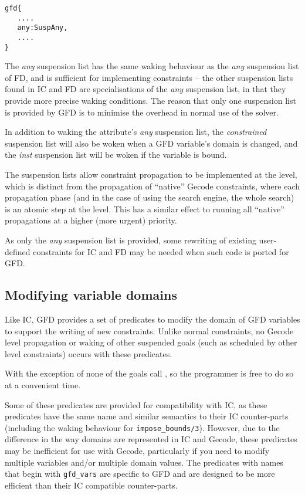 \begin{verbatim}
gfd{
   ....
   any:SuspAny,
   ....
}
\end{verbatim}

The {\it any\/} suspension list has the same waking behaviour as the 
{\it any\/} suspension
list of FD, and is sufficient for implementing constraints -- the other 
suspension lists found in IC and FD are specialisations of the {\it any\/} 
suspension list, in that they provide more precise waking conditions. 
The reason that
only one suspension list is provided by GFD is to minimise the overhead in
normal use of the solver. 


In addition to waking the attribute's {\it any\/} suspension list, the 
{\it constrained\/}
suspension list will also be woken when a GFD variable's domain is changed,
and the {\it inst\/} suspension list will be woken if the variable is bound.

The suspension lists allow constraint propagation to be implemented at the
{\eclipse} level, which is distinct from the propagation of ``native'' Gecode
constraints, where each propagation phase (and in the case of using the 
search engine, the whole search) is an atomic step at the {\eclipse} level. 
This has a similar effect to running all ``native'' propagations
at a higher (more urgent) priority.
 
As only the {\it any\/} suspension list is provided, some rewriting of existing
user-defined constraints for IC and FD may be needed when such code is ported
for GFD.

\subsection{Modifying variable domains}

Like IC, GFD provides a set of predicates to modify the domain of GFD 
variables to support the writing of new constraints. Unlike normal constraints,
no Gecode level propagation or waking of other suspended goals (such as 
scheduled by other {\eclipse} level constraints) occurs with these predicates.

With the exception of
 none of
the goals call , so
the programmer is free to do so at a convenient time.

Some of these predicates are provided for compatibility with IC, as these 
predicates have the same name and similar semantics to their IC counter-parts
(including the waking behaviour for {\tt impose_bounds/3}).
However, due to the difference in the way domains are represented in IC and
Gecode, these predicates may be inefficient for use with Gecode, particularly
if you need to modify multiple variables and/or multiple domain values. 
The predicates with names that begin with {\tt gfd_vars} are specific
to GFD and are designed to be more efficient than their IC compatible 
counter-parts.

